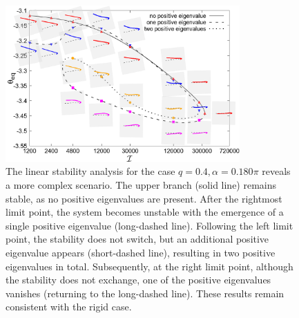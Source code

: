 \documentclass[a4paper,12pt]{report}
\begin{document}
\begin{figure}[!h]
	\begin{center}
		\includegraphics[width=0.8\textwidth]{plot/RESLT_q_0.40_alpha_0.180pi_plot_step_refine2_new_recale_FSI/combine_elastic_beam_I_theta_q_0.400_alpha_0.180pi_initial_-4.80_refine2_new_dash_line.png}
		\caption{The linear stability analysis for the case $q=0.4,\alpha=0.180\pi$ reveals a more complex scenario. The upper branch (solid line) remains stable, as no positive eigenvalues are present. After the rightmost limit point, the system becomes unstable with the emergence of a single positive eigenvalue (long-dashed line). Following the left limit point, the stability does not switch, but an additional positive eigenvalue appears (short-dashed line), resulting in two positive eigenvalues in total. Subsequently, at the right limit point, although the stability does not exchange, one of the positive eigenvalues vanishes (returning to the long-dashed line). These results remain consistent with the rigid case.}
		\label{fig:11}
	\end{center}
\end{figure}
\end{document}

